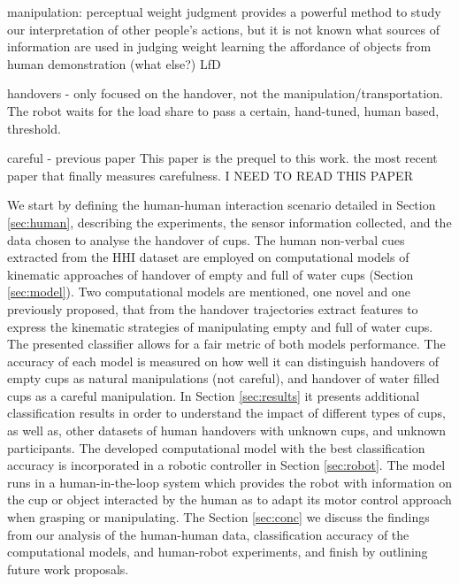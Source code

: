manipulation:
\cite{hamilton_kinematic_2007} perceptual weight judgment provides a powerful method to study our interpretation of other people's actions, but it is not known what sources of information are used in judging weight
\cite{kjellstrom_visual_2011} learning the affordance of objects from human demonstration (what else?)
\cite{santina_learning_2019} LfD

handovers - 
\cite{Medina2016} only focused on the handover, not the manipulation/transportation. The robot waits for the load share to pass a certain, hand-tuned, human based, threshold.

careful - 
previous paper \cite{duarte_human_2020} This paper is the prequel to this work.
\cite{lastrico_careful_2021} the most recent paper that finally measures carefulness. I NEED TO READ THIS PAPER

We start by defining the human-human interaction scenario detailed in Section \ref{sec:human}, describing the experiments, the sensor information collected, and the data chosen to analyse the handover of cups. The human non-verbal cues extracted from the HHI dataset are employed on computational models of kinematic approaches of handover of empty and full of water cups (Section \ref{sec:model}). Two computational models are mentioned, one novel and one previously proposed, that from the handover trajectories extract features to express the kinematic strategies of manipulating empty and full of water cups. The presented classifier allows for a fair metric of both models performance. The accuracy of each model is measured on how well it can distinguish handovers of empty cups as natural manipulations (not careful), and handover of water filled cups as a careful manipulation. In Section \ref{sec:results} it presents additional classification results in order to understand the impact of different types of cups, as well as, other datasets of human handovers with unknown cups, and unknown participants. The developed computational model with the best classification accuracy is incorporated in a robotic controller in Section \ref{sec:robot}. The model runs in a human-in-the-loop system which provides the robot with information on the cup or object interacted by the human as to adapt its motor control approach when grasping or manipulating. The Section \ref{sec:conc} we discuss the findings from our analysis of the human-human data, classification accuracy of the computational models, and human-robot experiments, and finish by outlining future work proposals.  


